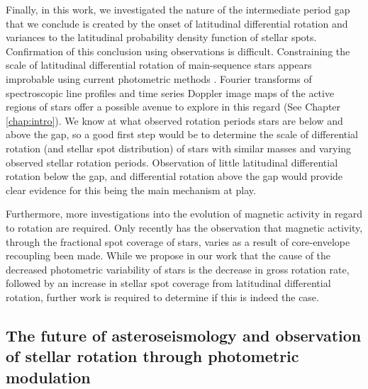 Finally, in this work, we investigated the nature of the intermediate period gap that we conclude is created by the onset of latitudinal differential rotation and variances to the latitudinal probability density function of stellar spots.
Confirmation of this conclusion using observations is difficult.
Constraining the scale of latitudinal differential rotation of main-sequence stars appears improbable using current photometric methods \citep[See Section 4.3 of][]{aigrain_hare_2015}.
Fourier transforms of spectroscopic line profiles and time series Doppler image maps of the active regions of stars offer a possible avenue to explore in this regard (See Chapter \ref{chap:intro}).
We know at what observed rotation periods stars are below and above the gap, so a good first step would be to determine the scale of differential rotation (and stellar spot distribution) of stars with similar masses and varying observed stellar rotation periods.
Observation of little latitudinal differential rotation below the gap, and differential rotation above the gap would provide clear evidence for this being the main mechanism at play.

Furthermore, more investigations into the evolution of magnetic activity in regard to rotation are required.
Only recently has the observation that magnetic activity, through the fractional spot coverage of stars, varies as a result of core-envelope recoupling been made.
While we propose in our work that the cause of the decreased photometric variability of stars is the decrease in gross rotation rate, followed by an increase in stellar spot coverage from latitudinal differential rotation, further work is required to determine if this is indeed the case.

\subsection{The future of asteroseismology and observation of stellar rotation through photometric modulation}

